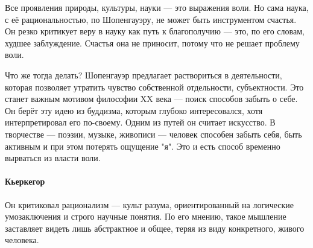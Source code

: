 Все проявления природы, культуры, науки --- это выражения воли. Но сама наука, с её рациональностью, по Шопенгауэру, не может быть инструментом счастья. Он резко критикует веру в науку как путь к благополучию --- это, по его словам, худшее заблуждение. Счастья она не приносит, потому что не решает проблему воли.

Что же тогда делать? Шопенгауэр предлагает раствориться в деятельности, которая позволяет утратить чувство собственной отдельности, субъектности. Это станет важным мотивом философии XX века --- поиск способов забыть о себе. Он берёт эту идею из буддизма, которым глубоко интересовался, хотя интерпретировал его по-своему. Одним из путей он считает искусство. В творчестве --- поэзии, музыке, живописи --- человек способен забыть себя, быть активным и при этом потерять ощущение "я". Это и есть способ временно вырваться из власти воли.

\paragraph{Кьеркегор}

Он критиковал рационализм --- культ разума, ориентированный на логические умозаключения и строго научные понятия. По его мнению, такое мышление заставляет видеть лишь абстрактное и общее, теряя из виду конкретного, живого человека.

